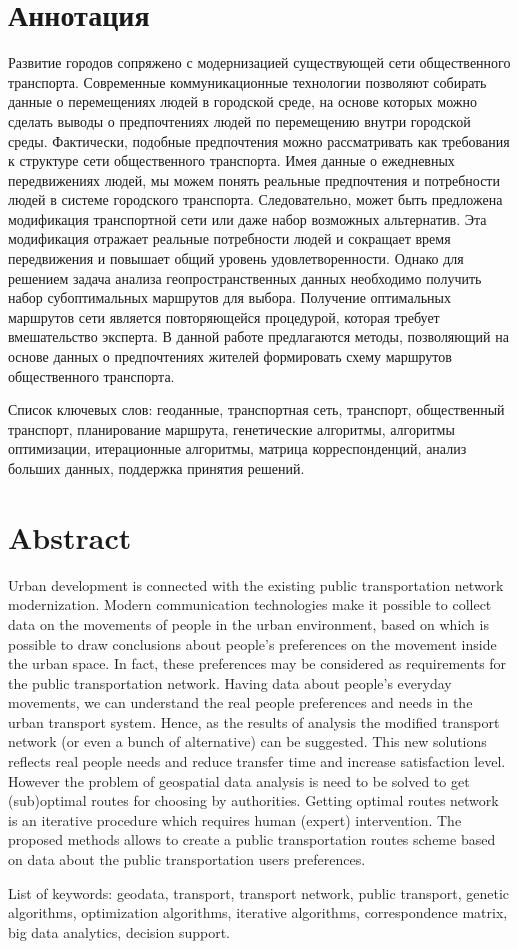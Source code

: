 \tocless\part{Аннотация}
Развитие городов сопряжено с модернизацией существующей сети общественного транспорта. Современные 
коммуникационные технологии позволяют собирать данные о перемещениях людей в городской среде, на основе 
которых можно сделать выводы о предпочтениях людей по перемещению внутри городской среды. Фактически, 
подобные предпочтения можно рассматривать как требования к структуре сети общественного транспорта. 
Имея данные о ежедневных передвижениях людей, мы можем понять реальные предпочтения и потребности людей 
в системе городского транспорта. Следовательно, может быть предложена модификация транспортной сети или 
даже набор возможных альтернатив. Эта модификация отражает реальные потребности людей и сокращает время 
передвижения и повышает общий уровень удовлетворенности. Однако для решением задача анализа 
геопространственных данных необходимо получить набор субоптимальных маршрутов для выбора. Получение 
оптимальных маршрутов сети является повторяющейся процедурой, которая требует вмешательство эксперта.
В данной работе предлагаются методы, позволяющий на основе данных о предпочтениях жителей формировать 
схему маршрутов общественного транспорта.

Список ключевых слов: геоданные, транспортная сеть, транспорт, общественный транспорт, планирование маршрута, 
генетические алгоритмы, алгоритмы оптимизации, итерационные алгоритмы, матрица корреспонденций, анализ 
больших данных, поддержка принятия решений.

\tocless\part{Abstract}
Urban development is connected with the existing public transportation network modernization. Modern 
communication technologies make it possible to collect data on the movements of people in the urban 
environment, based on which is possible to draw conclusions about people's preferences on the movement 
inside the urban space. In fact, these preferences may be considered as requirements for the public 
transportation network. Having data about people's everyday movements, we can understand the real 
people preferences and needs in the urban transport system. Hence, as the results of analysis the 
modified transport network (or even a bunch of alternative) can be suggested. This new solutions reflects 
real people needs and reduce transfer time and increase satisfaction level. However the problem of 
geospatial data analysis is need to be solved to get (sub)optimal routes for choosing by authorities. 
Getting optimal routes network is an iterative procedure which requires human (expert) intervention.
The proposed methods allows to create a public transportation routes scheme based on data about the 
public transportation users preferences.

List of keywords: geodata, transport, transport network, public transport, genetic algorithms, 
optimization algorithms, iterative algorithms, correspondence matrix, big data analytics, decision support.